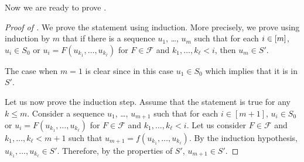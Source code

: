 Now we are ready to prove .
\begin{proof}[Proof of ]
    We prove the statement using induction. More precisely, we prove using
    induction by $m$ that if there is a sequence
    $u_1$, \dots, $u_m$ such that
    for each $i \in {[{m}]}$, $u_i \in S_0$ or $u_i = F(u_{k_1}, \dots, u_{k_\ell})$
    for $F \in \mathcal{F}$ and $k_1, \dots, k_\ell < i$, then $u_m \in S'$.

    The case when $m = 1$ is clear since in this case $u_1 \in S_0$ which implies
    that it is in $S'$.

    Let us now prove the induction step. Assume that the statement is true for any
    $k \le m$. Consider a sequence $u_1$, \dots, $u_{m + 1}$ such that
    for each $i \in [m + 1]$,
    $u_i \in S_0$ or $u_i = F(u_{k_1}, \dots, u_{k_\ell})$
    for $F \in \mathcal{F}$ and $k_1, \dots, k_\ell < i$. Let us consider
    $F \in \mathcal{F}$ and $k_1, \dots, k_\ell < m + 1$ such that
    $u_{m + 1} = f(u_{k_1}, \dots, u_{k_\ell})$. By the induction hypothesis,
    $u_{k_1}, \dots, u_{k_\ell} \in S'$. Therefore, by the properties of $S'$,
    $u_{m + 1} \in S'$.
\end{proof}

